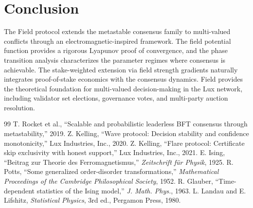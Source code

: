 \section{Conclusion}

\label{sec:conclusion}

The Field protocol extends the metastable consensus family to multi-valued conflicts
through an electromagnetic-inspired framework. The field potential function provides
a rigorous Lyapunov proof of convergence, and the phase transition analysis characterizes
the parameter regimes where consensus is achievable. The stake-weighted extension via
field strength gradients naturally integrates proof-of-stake economics with the consensus
dynamics. Field provides the theoretical foundation for multi-valued decision-making
in the Lux network, including validator set elections, governance votes, and multi-party
auction resolution.

\begin{thebibliography}{99}
 T. Rocket et al., ``Scalable and probabilistic leaderless BFT consensus through metastability,'' 2019.
 Z. Kelling, ``Wave protocol: Decision stability and confidence monotonicity,'' Lux Industries, Inc., 2020.
 Z. Kelling, ``Flare protocol: Certificate skip exclusivity with honest support,'' Lux Industries, Inc., 2021.
 E. Ising, ``Beitrag zur Theorie des Ferromagnetismus,'' \emph{Zeitschrift f\"ur Physik}, 1925.
 R. Potts, ``Some generalized order-disorder transformations,'' \emph{Mathematical Proceedings of the Cambridge Philosophical Society}, 1952.
 R. Glauber, ``Time-dependent statistics of the Ising model,'' \emph{J. Math. Phys.}, 1963.
 L. Landau and E. Lifshitz, \emph{Statistical Physics}, 3rd ed., Pergamon Press, 1980.
\end{thebibliography}

